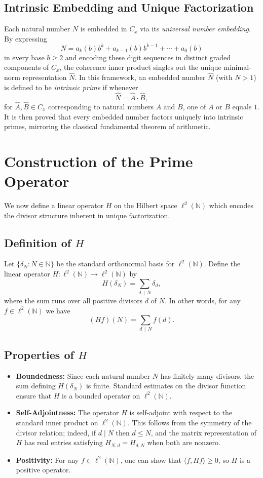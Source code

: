 \documentclass{article}
\begin{document}
\subsection{Intrinsic Embedding and Unique Factorization}
Each natural number \(N\) is embedded in \(C_x\) via its \emph{universal number embedding}. By expressing
\[
N = a_k(b) b^k + a_{k-1}(b) b^{k-1} + \cdots + a_0(b)
\]
in every base \(b\ge2\) and encoding these digit sequences in distinct graded components of \(C_x\), the coherence inner product singles out the unique minimal-norm representation \(\widehat{N}\). In this framework, an embedded number \(\widehat{N}\) (with \(N>1\)) is defined to be \emph{intrinsic prime} if whenever 
\[
\widehat{N} = \widehat{A} \cdot \widehat{B},
\]
for \(\widehat{A},\widehat{B} \in C_x\) corresponding to natural numbers \(A\) and \(B\), one of \(A\) or \(B\) equals \(1\). It is then proved that every embedded number factors uniquely into intrinsic primes, mirroring the classical fundamental theorem of arithmetic.

\section{Construction of the Prime Operator}
We now define a linear operator \(H\) on the Hilbert space \(\ell^2(\mathbb{N})\) which encodes the divisor structure inherent in unique factorization.

\subsection{Definition of \(H\)}
Let \(\{\delta_N : N\in\mathbb{N}\}\) be the standard orthonormal basis for \(\ell^2(\mathbb{N})\). Define the linear operator \(H : \ell^2(\mathbb{N}) \to \ell^2(\mathbb{N})\) by
\[
H(\delta_N) = \sum_{d\,\mid\,N} \delta_d,
\]
where the sum runs over all positive divisors \(d\) of \(N\). In other words, for any \(f\in \ell^2(\mathbb{N})\) we have
\[
(Hf)(N) = \sum_{d\,\mid\,N} f(d).
\]

\subsection{Properties of \(H\)}
\begin{itemize}
  \item \textbf{Boundedness:} Since each natural number \(N\) has finitely many divisors, the sum defining \(H(\delta_N)\) is finite. Standard estimates on the divisor function ensure that \(H\) is a bounded operator on \(\ell^2(\mathbb{N})\).
  \item \textbf{Self-Adjointness:} The operator \(H\) is self-adjoint with respect to the standard inner product on \(\ell^2(\mathbb{N})\). This follows from the symmetry of the divisor relation; indeed, if \(d\mid N\) then \(d\le N\), and the matrix representation of \(H\) has real entries satisfying \(H_{N,d} = H_{d,N}\) when both are nonzero.
  \item \textbf{Positivity:} For any \(f\in\ell^2(\mathbb{N})\), one can show that \(\langle f, Hf \rangle \ge 0\), so \(H\) is a positive operator.
\end{itemize}
\end{document}
